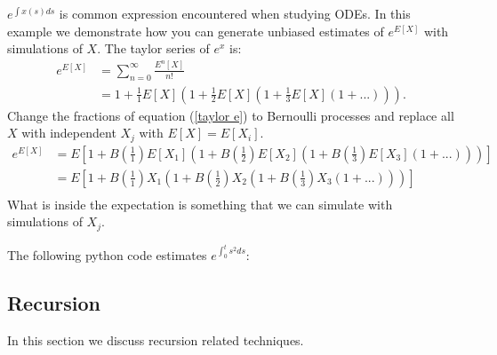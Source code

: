 \documentclass[a4paper,12pt]{article}
\begin{document}
\vspace*{0.2cm}
\begin{pythonn}[$y'=y^{2}$]
\end{pythonn}

\begin{example}[$e^{E[X]}$]
    $e^{\int x(s)ds}$ is common expression encountered when studying ODEs.
    In this example we demonstrate how you can generate unbiased estimates of
    $e^{E[X]}$ with simulations of $X$. The taylor series of $e^{x}$ is:
    \begin{align}
        e^{E[X]} & = \sum_{n=0}^{\infty} \frac{E^{n}[X]}{n!}     \\
                 & = 1 + \frac{1}{1}E[X]\left(1+ \frac{1}{2}E[X]
        \left(1+\frac{1}{3}E[X]\left(1+ ...\right)\right)\right). \label{taylor e}
    \end{align}
    Change the fractions of equation (\ref{taylor e}) to Bernoulli processes
    and replace all $X$ with independent $X_j$ with $E[X]=E[X_{i}]$.
    \begin{align*}
        e^{E[X]} & = E
        \left[1 + B\left(\frac{1}{1}\right)E[X_1]
        \left(1+ B\left(\frac{1}{2}\right)E[X_2]
        \left(1+B\left(\frac{1}{3}\right)E[X_3]
        \left(1+ ...\right)
        \right)
        \right)
        \right]              \\
                 & = E\left[
            1 + B\left(\frac{1}{1}\right)X_1
            \left(1+ B\left(\frac{1}{2}\right)X_2
            \left(1+B\left(\frac{1}{3}\right)X_3
            \left(1+ ...\right)
            \right)
            \right)
        \right]              \\
    \end{align*}
    What is inside the expectation is something that we can simulate with simulations of $X_{j}$.
\end{example}

\vspace{0.2cm}
\begin{pythonn}[$e^{E[X]}$]
    The following python code estimates $e^{\int_{0}^{t} s^{2}ds}$:
    \vspace*{0.4cm}
\end{pythonn}

\subsection{Recursion}
In this section we discuss recursion related techniques.
\end{document}
